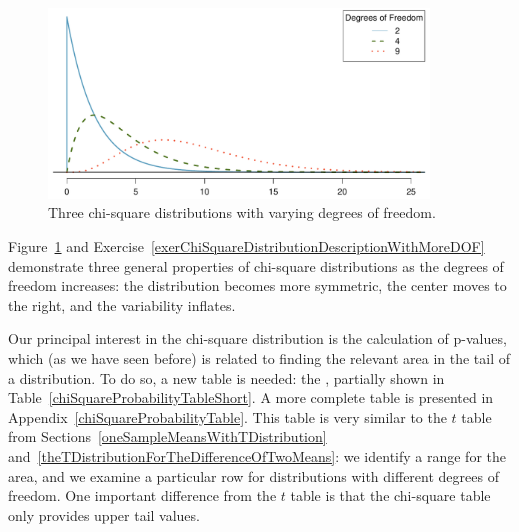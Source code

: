 \begin{figure}[h]
\centering
\includegraphics[width=0.9\textwidth]{06/figures/chiSquareDistributionWithInceasingDF/chiSquareDistributionWithInceasingDF}
\caption{Three chi-square distributions with varying degrees of freedom.}
\label{chiSquareDistributionWithInceasingDF}
\end{figure}

Figure~\ref{chiSquareDistributionWithInceasingDF} and Exercise~\ref{exerChiSquareDistributionDescriptionWithMoreDOF} demonstrate three general properties of chi-square distributions as the degrees of freedom increases: the distribution becomes more symmetric, the center moves to the right, and the variability inflates.

Our principal interest in the chi-square distribution is the calculation of p-values, which (as we have seen before) is related to finding the relevant area in the tail of a distribution. To do so, a new table is needed: the , partially shown in Table~\ref{chiSquareProbabilityTableShort}. A more complete table is presented in Appendix~\vref{chiSquareProbabilityTable}. This table is very similar to the $t$ table from Sections~\ref{oneSampleMeansWithTDistribution} and~\ref{theTDistributionForTheDifferenceOfTwoMeans}: we identify a range for the area, and we examine a particular row for distributions with different degrees of freedom. One important difference from the $t$ table is that the chi-square table only provides upper tail values.

